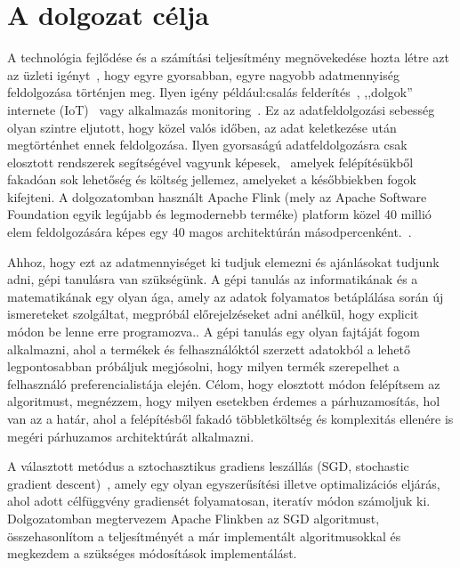 \documentclass[a4paper,12pt]{article}
\begin{document}
\section{A dolgozat célja}
A technológia fejlődése és a számítási teljesítmény megnövekedése hozta létre azt az üzleti igényt~\cite{rta}, hogy egyre gyorsabban, egyre nagyobb adatmennyiség feldolgozása történjen meg. Ilyen igény például:csalás felderítés~\cite{fraud}, ,,dolgok'' internete (IoT)~\cite{iot} vagy alkalmazás monitoring~\cite{ganalitycs}. Ez az adatfeldolgozási sebesség olyan szintre eljutott, hogy közel valós időben, az adat keletkezése után megtörténhet ennek feldolgozása. Ilyen gyorsaságú adatfeldolgozásra csak elosztott rendszerek segítségével vagyunk képesek,~\cite{ucl} amelyek felépítésükből fakadóan sok lehetőség és költség jellemez, amelyeket a későbbiekben fogok kifejteni. A dolgozatomban használt Apache Flink (mely az Apache Software Foundation egyik legújabb és legmodernebb terméke) platform közel 40 millió elem feldolgozására képes egy 40 magos architektúrán másodpercenként.~\cite{flinkintro}.\newline

Ahhoz, hogy ezt az adatmennyiséget ki tudjuk elemezni és ajánlásokat tudjunk adni, gépi tanulásra van szükségünk. A gépi tanulás az informatikának és a matematikának egy olyan ága, amely az adatok folyamatos betáplálása során új ismereteket szolgáltat, megpróbál előrejelzéseket adni anélkül, hogy explicit módon be lenne erre programozva.\cite{ml}. A gépi tanulás egy olyan fajtáját fogom alkalmazni, ahol a termékek és felhasználóktól szerzett adatokból a lehető legpontosabban próbáljuk megjósolni, hogy milyen termék szerepelhet a felhasználó preferencialistája elején. Célom, hogy elosztott módon felépítsem az algoritmust, megnézzem, hogy milyen esetekben érdemes a párhuzamosítás, hol van az a határ, ahol a felépítésből fakadó többletköltség és komplexitás ellenére is megéri párhuzamos architektúrát alkalmazni. 
\newline

A választott metódus a sztochasztikus gradiens leszállás (SGD, stochastic gradient descent)~\cite{sgd}, amely egy olyan egyszerűsítési illetve optimalizációs eljárás, ahol adott célfüggvény gradiensét folyamatosan, iteratív módon számoljuk ki. Dolgozatomban megtervezem Apache Flinkben az SGD algoritmust, összehasonlítom a teljesítményét a már implementált algoritmusokkal és megkezdem a szükséges módosítások implementálást.

\newpage
\end{document}
